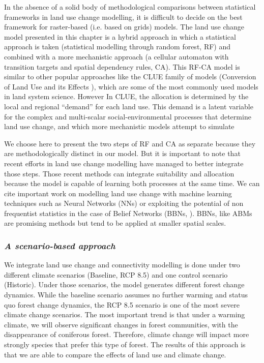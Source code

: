 In the absence of a solid body of methodological comparisons between statistical frameworks in land use change modelling, it is difficult to decide on the best framework for raster-based (i.e. based on grids) models. The land use change model presented in this chapter is a  hybrid approach in which a statistical approach is taken (statistical modelling through random forest, RF) and combined with a more mechanistic approach (a cellular automaton with transition targets and spatial dependency rules, CA). This RF-CA model is similar to other popular approaches like the CLUE family of models (Conversion of Land Use and its Effects \cite{verburg_modeling_2002, verburg_combining_2009}), which are some of the most commonly used models in land system science. However In CLUE, the allocation is determined by the local and regional “demand” for each land use. This demand is a latent variable for the complex and multi-scalar social-environmental processes that determine land use change, and which more mechanistic models attempt to simulate \citep{verburg_combining_2009}

We choose here to present the two steps of RF and CA as separate because they are methodologically distinct in our model. But it is important to note that recent efforts in land use change modelling have managed to better integrate those steps. Those recent methods can integrate suitability and allocation because the model is capable of learning both processes at the same time. We can cite important work on modelling land use change with machine learning techniques such as Neural Networks (NNs) \citep{tayyebi_simulating_2013} or exploiting the potential of non frequentist statistics in the case of Belief Networks (BBNs, \cite{celio_modeling_2014}). BBNs, like ABMs are promising methods but tend to be applied at smaller spatial scales. \\

\subsubsection*{\textit{A scenario-based approach}}
We integrate land use change and connectivity modelling is done under two different climate scenarios (Baseline, RCP 8.5) and one control scenario (Historic). Under those scenarios, the model generates different forest change dynamics. While the baseline scenario assumes no further warming and status quo forest change dynamics, the RCP 8.5 scenario is one of the most severe climate change scenarios. The most important trend is that under a warming climate, we will observe significant changes in forest communities, with the disappearance of coniferous forest. \citep{ref_on_forest_change} Therefore, climate change will impact more strongly species that prefer this type of forest. The results of this approach is that we are able to compare the effects of land use and climate change. 

